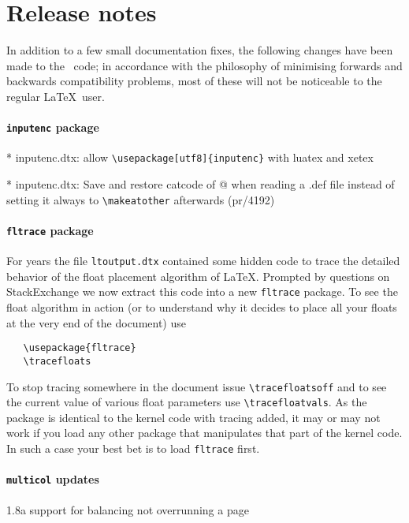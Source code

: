 \documentclass{ltnews}
\begin{document}
\section{Release notes}

In addition to a few small documentation fixes, the following changes
have been made to the \LaTeXe\ code; in accordance with the philosophy
of minimising forwards and backwards compatibility problems, most of
these will not be noticeable to the regular \LaTeX\ user.

\paragraph{\texttt{inputenc} package}

	* inputenc.dtx: allow \verb=\usepackage[utf8]{inputenc}= with luatex and xetex

	* inputenc.dtx: Save and restore catcode of @ when reading a .def file
	instead of setting it always to \verb=\makeatother= afterwards (pr/4192)

\paragraph{\texttt{fltrace} package}

For years the file \texttt{ltoutput.dtx} contained some hidden code to
trace the detailed behavior of the float placement algorithm of
\LaTeX. Prompted by questions on StackExchange we now extract this
code into a new \texttt{fltrace} package. To see the float algorithm
in action (or to understand why it decides to place all your floats at
the very end of the document) use
\begin{verbatim}
   \usepackage{fltrace}
   \tracefloats
\end{verbatim}
To stop tracing somewhere in the document issue
\verb=\tracefloatsoff= and to see the current value of various float
parameters use \verb=\tracefloatvals=. As the package is identical to
the kernel code with tracing added, it may or may not work if you load any
other package that manipulates that part of the kernel code. In such a
case your best bet is to load \texttt{fltrace} first.


\paragraph{\texttt{multicol} updates}

1.8a support for balancing not overrunning a page
\end{document}
